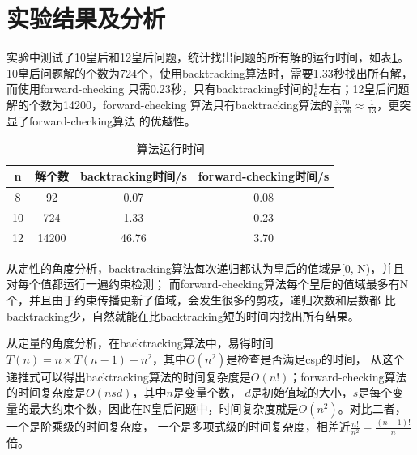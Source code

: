 \documentclass[10pt,letterpaper]{ctexart}
\newcommand{\tabref}[1]{表\ref{#1}}
\begin{document}
\section{实验结果及分析}
实验中测试了10皇后和12皇后问题，统计找出问题的所有解的运行时间，如\tabref{tab:time}。
10皇后问题解的个数为724个，使用backtracking算法时，需要1.33秒找出所有解，而使用forward-checking
只需0.23秒，只有backtracking时间的$\frac{1}{6}$左右；12皇后问题解的个数为14200，forward-checking
算法只有backtracking算法的$\frac{3.70}{46.76}\approx \frac{1}{13}$，更突显了forward-checking算法
的优越性。
\begin{table}[!htbp]
  \centering
  \begin{tabular}{cccc}
    \toprule  
    n& 解个数& backtracking时间/s& forward-checking时间/s\\
    \midrule
    8& 92& 0.07& 0.08\\
    10& 724& 1.33& 0.23\\
    12& 14200& 46.76& 3.70\\
    \bottomrule 
  \end{tabular}
  \caption{算法运行时间}
  \label{tab:time}
\end{table}
\par 从定性的角度分析，backtracking算法每次递归都认为皇后的值域是[0, N)，并且对每个值都运行一遍约束检测；
而forward-checking算法每个皇后的值域最多有N个，并且由于约束传播更新了值域，会发生很多的剪枝，递归次数和层数都
比backtracking少，自然就能在比backtracking短的时间内找出所有结果。
\par 从定量的角度分析，在backtracking算法中，易得时间$T(n) = n\times T(n-1) + n^2$，其中$O(n^2)$是检查是否满足csp的时间，
从这个递推式可以得出backtracking算法的时间复杂度是$O(n!)$；forward-checking算法的时间复杂度是$O(nsd)$，其中$n$是变量个数，
$d$是初始值域的大小，$s$是每个变量的最大约束个数，因此在N皇后问题中，时间复杂度就是$O(n^2)$。对比二者，一个是阶乘级的时间复杂度，
一个是多项式级的时间复杂度，相差近$\frac{n!}{n^2}=\frac{(n-1)!}{n}$倍。
\end{document}

